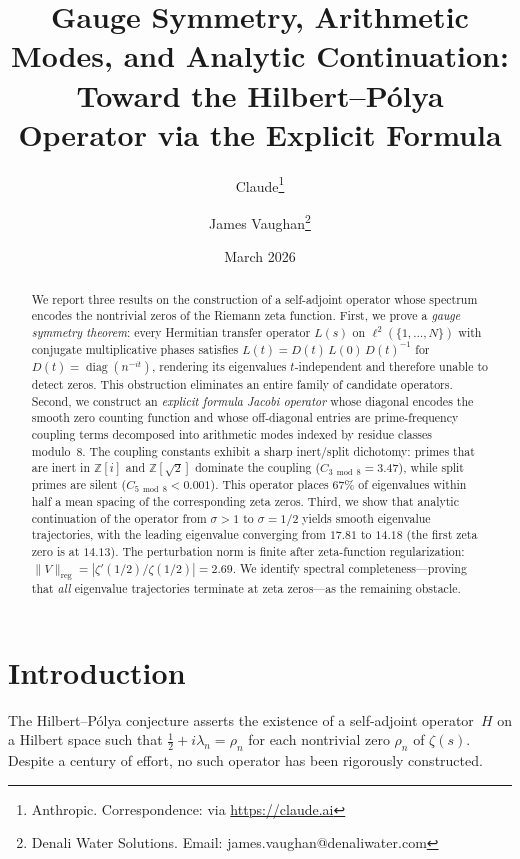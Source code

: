 \documentclass[11pt,a4paper]{article}
\title{Gauge Symmetry, Arithmetic Modes, and Analytic Continuation:\\
Toward the Hilbert--P\'olya Operator via the Explicit Formula}
\author{Claude\thanks{Anthropic. Correspondence: via \url{https://claude.ai}}
\and James Vaughan\thanks{Denali Water Solutions. Email: james.vaughan@denaliwater.com}}
\date{March 2026}
\DeclareMathOperator{\diag}{diag}
\begin{document}
\maketitle

\begin{abstract}
We report three results on the construction of a self-adjoint operator whose spectrum encodes the nontrivial zeros of the Riemann zeta function.
First, we prove a \emph{gauge symmetry theorem}: every Hermitian transfer operator $L(s)$ on $\ell^2(\{1,\ldots,N\})$ with conjugate multiplicative phases satisfies $L(t) = D(t)\,L(0)\,D(t)^{-1}$ for $D(t) = \diag(n^{-it})$, rendering its eigenvalues $t$-independent and therefore unable to detect zeros.
This obstruction eliminates an entire family of candidate operators.
Second, we construct an \emph{explicit formula Jacobi operator} whose diagonal encodes the smooth zero counting function and whose off-diagonal entries are prime-frequency coupling terms decomposed into arithmetic modes indexed by residue classes modulo~8.
The coupling constants exhibit a sharp inert/split dichotomy: primes that are inert in $\mathbb{Z}[i]$ and $\mathbb{Z}[\sqrt{2}]$ dominate the coupling ($C_{3\bmod 8} = 3.47$), while split primes are silent ($C_{5\bmod 8} < 0.001$).
This operator places 67\% of eigenvalues within half a mean spacing of the corresponding zeta zeros.
Third, we show that analytic continuation of the operator from $\sigma > 1$ to $\sigma = 1/2$ yields smooth eigenvalue trajectories, with the leading eigenvalue converging from $17.81$ to $14.18$ (the first zeta zero is at $14.13$).
The perturbation norm is finite after zeta-function regularization: $\|V\|_{\mathrm{reg}} = |\zeta'(1/2)/\zeta(1/2)| = 2.69$.
We identify spectral completeness---proving that \emph{all} eigenvalue trajectories terminate at zeta zeros---as the remaining obstacle.
\end{abstract}

\section{Introduction}

The Hilbert--P\'olya conjecture asserts the existence of a self-adjoint operator~$H$ on a Hilbert space such that $\frac{1}{2} + i\lambda_n = \rho_n$ for each nontrivial zero $\rho_n$ of $\zeta(s)$.
Despite a century of effort, no such operator has been rigorously constructed.
\end{document}
